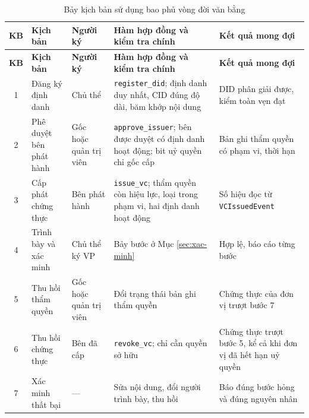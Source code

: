 \begin{longtable}{|c|p{2.6cm}|p{2.3cm}|p{4.5cm}|p{3.4cm}|}
\caption{Bảy kịch bản sử dụng bao phủ vòng đời văn bằng}
\label{tab:v2-scenarios} \\
\hline
\textbf{KB} & \textbf{Kịch bản} & \textbf{Người ký} & \textbf{Hàm hợp đồng và kiểm tra chính} & \textbf{Kết quả mong đợi} \\ \hline
\endfirsthead
\hline
\textbf{KB} & \textbf{Kịch bản} & \textbf{Người ký} & \textbf{Hàm hợp đồng và kiểm tra chính} & \textbf{Kết quả mong đợi} \\ \hline
\endhead
1 & Đăng ký định danh & Chủ thể & \texttt{register\_did}; định danh duy nhất, CID đúng độ dài, băm khớp nội dung & DID phân giải được, kiểm toàn vẹn đạt \\ \hline
2 & Phê duyệt bên phát hành & Gốc hoặc quản trị viên & \texttt{approve\_issuer}; bên được duyệt có định danh hoạt động; bit uỷ quyền chỉ gốc cấp & Bản ghi thẩm quyền có phạm vi, thời hạn \\ \hline
3 & Cấp phát chứng thực & Bên phát hành & \texttt{issue\_vc}; thẩm quyền còn hiệu lực, loại trong phạm vi, hai định danh hoạt động & Số hiệu đọc từ \texttt{VCIssuedEvent} \\ \hline
4 & Trình bày và xác minh & Chủ thể ký VP & Bảy bước ở Mục \ref{sec:xac-minh} & Hợp lệ, báo cáo từng bước \\ \hline
5 & Thu hồi thẩm quyền & Gốc hoặc quản trị viên & Đổi trạng thái bản ghi thẩm quyền & Chứng thực của đơn vị trượt bước 7 \\ \hline
6 & Thu hồi chứng thực & Bên đã cấp & \texttt{revoke\_vc}; chỉ cần quyền sở hữu & Chứng thực trượt bước 5, kể cả khi đơn vị đã hết hạn uỷ quyền \\ \hline
7 & Xác minh thất bại & --- & Sửa nội dung, đổi người trình bày, thu hồi & Báo đúng bước hỏng và đúng nguyên nhân \\ \hline
\end{longtable}
